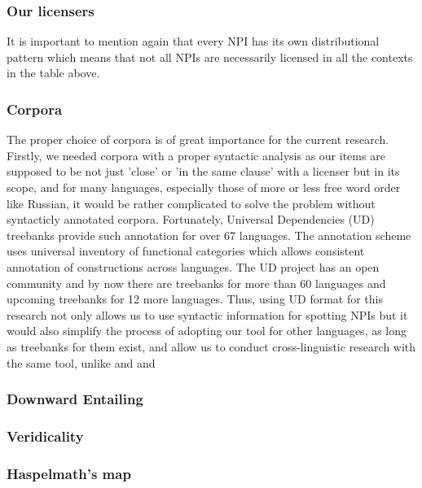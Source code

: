 \documentclass[a4paper,12pt]{article}
\begin{document}
	\subsubsection{Our licensers}\label{ourlicensers}
	
	\par
	It is important to mention again that every NPI has its own distributional pattern which means that not all NPIs are necessarily licensed in all the contexts in the table above.

	\subsubsection{Corpora}
	
	The proper choice of corpora is of great importance for the current research. Firstly, we needed corpora with a proper syntactic analysis as our items are supposed to be not just 'close' or 'in the same clause' with a licenser but in its scope, and for many languages, especially those of more or less free word order like Russian, it would be rather complicated to solve the problem without syntacticly annotated corpora. Fortunately, Universal Dependencies (UD) treebanks provide such annotation for over 67 languages. The annotation scheme uses universal inventory of functional categories which allows consistent annotation of constructions across languages. The UD project has an open community and by now there are treebanks for more than 60 languages and upcoming treebanks for 12 more languages. Thus, using UD format for this research not only allows us to use syntactic information for spotting NPIs but it would also simplify the process of adopting our tool for other languages, as long as treebanks for them exist, and allow us to conduct cross-linguistic research with the same tool, unlike \textcite{soehnlichte2010} and \parencite{multiwordnpiger} and \autocite{apresyannpi}
	

	 
	
	\subsubsection{Downward Entailing}
	
	\subsubsection{Veridicality}
	
	\subsubsection{Haspelmath's map}
	
\end{document}
